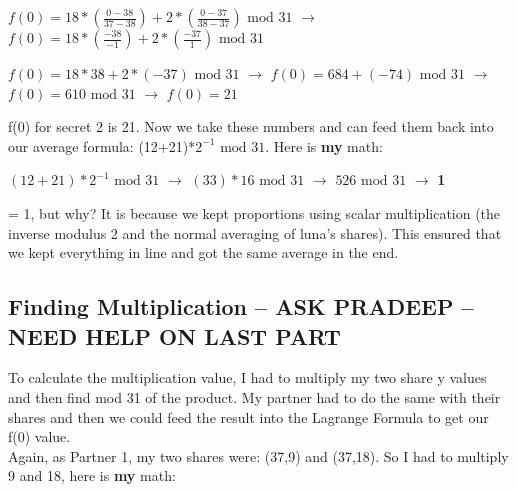 \documentclass[10pt]{article}
\begin{document}

$f(0) = 18*\left(\frac{0 - 38}{37 - 38}\right) + 2*\left(\frac{0 - 37}{38 - 37}\right) \textrm{ mod } 31$
$\rightarrow$
$f(0) = 18*\left(\frac{-38}{-1}\right) + 2*\left(\frac{-37}{1}\right)  \textrm{ mod } 31$
\vspace{0.1in}

$f(0) = 18*38 + 2*(-37)  \textrm{ mod } 31$
$\rightarrow$
$f(0) = 684 + (-74)  \textrm{ mod } 31$
$\rightarrow$
$f(0) = 610  \textrm{ mod } 31$
$\rightarrow$
$f(0) = 21$
\vspace{0.15in}

\noindent f(0) for secret 2 is 21.  Now we take these numbers and can feed them back into our average formula: (12+21)*$2^{-1} \textrm{ mod } 31$.  Here is \textbf{my} math:\\ \vspace{0.1in}

$\left(12+21\right)*2^{-1} \textrm{ mod } 31$ $\rightarrow$
$\left(33\right)*16 \textrm{ mod } 31$ $\rightarrow$
$526 \textrm{ mod } 31$ $\rightarrow$ \textbf{1}\\
\vspace{0.15in}

 = 1, but why? It is because we kept proportions using scalar multiplication (the inverse modulus 2 and the normal averaging of luna's shares). This ensured that we kept everything in line and got the same average in the end. 










\vspace{0.2in}
\subsection{Finding Multiplication -- ASK PRADEEP -- NEED HELP ON LAST PART}
\noindent To calculate the multiplication value, I had to multiply my two share y values and then find mod 31 of the product. My partner had to do the same with their shares and then we could feed the result into the Lagrange Formula to get our f(0) value.\\
Again, as Partner 1, my two shares were: (37,9) and (37,18). 
So I had to multiply 9 and 18, here is \textbf{my} math:\\ \vspace{0.1in}
\end{document}
